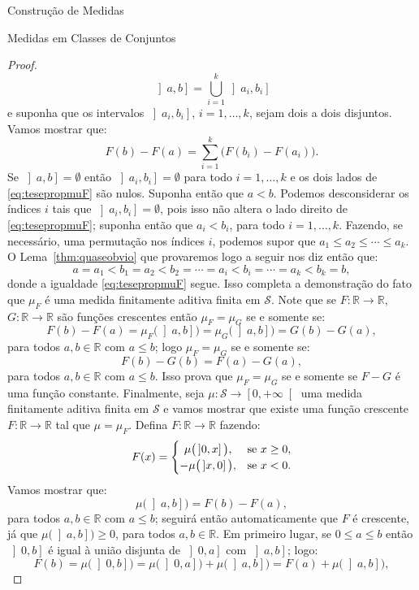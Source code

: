 \documentclass[oneside,final,11pt]{amsbook}
\newcommand{\R}{\mathds R}
\theoremstyle{remark}\newtheorem{exercise}{Exercício}[chapter]
\theoremstyle{remark}\newtheorem{*exercise}[exercise]{\hbox to 0pt{\hskip 0pt minus 1fil*}Exercício}
\theoremstyle{definition}\newtheorem{exdefin}{Definição}[chapter]
\theoremstyle{plain}\newtheorem{teo}{Teorema}[section]
\theoremstyle{plain}\newtheorem{lem}[teo]{Lema}
\theoremstyle{plain}\newtheorem{prop}[teo]{Proposição}
\theoremstyle{plain}\newtheorem{cor}[teo]{Corolário}
\theoremstyle{definition}\newtheorem{defin}[teo]{Definição}
\theoremstyle{remark}\newtheorem{rem}[teo]{Observação}
\theoremstyle{definition}\newtheorem{notation}[teo]{Notação}
\theoremstyle{definition}\newtheorem{convention}[teo]{Convenção}
\theoremstyle{definition}\newtheorem{example}[teo]{Exemplo}
\numberwithin{section}{chapter}
\numberwithin{equation}{section}
\begin{document}
\begin{chapter}{Construção de Medidas}
\begin{section}{Medidas em Classes de Conjuntos}
\begin{proof}
\[\left]a,b\right]=\bigcup_{i=1}^k\left]a_i,b_i\right]\]
e suponha que os intervalos $\left]a_i,b_i\right]$, $i=1,\ldots,k$, sejam dois a dois disjuntos. Vamos mostrar que:
\begin{equation}\label{eq:tesepropmuF}
F(b)-F(a)=\sum_{i=1}^k\big(F(b_i)-F(a_i)\big).
\end{equation}
Se $\left]a,b\right]=\emptyset$ então $\left]a_i,b_i\right]=\emptyset$ para todo $i=1,\ldots,k$ e os dois lados
de \eqref{eq:tesepropmuF} são nulos. Suponha então que $a<b$. Podemos desconsiderar os índices $i$ tais que
$\left]a_i,b_i\right]=\emptyset$, pois isso não altera o lado direito de \eqref{eq:tesepropmuF}; suponha então
que $a_i<b_i$, para todo $i=1,\ldots,k$. Fazendo, se necessário, uma permutação nos índices $i$, podemos supor
que $a_1\le a_2\le\cdots\le a_k$. O Lema~\ref{thm:quaseobvio} que provaremos logo a seguir nos diz então que:
\[a=a_1<b_1=a_2<b_2=\cdots=a_i<b_i=\cdots=a_k<b_k=b,\]
donde a igualdade \eqref{eq:tesepropmuF} segue. Isso completa a demonstração do fato que $\mu_F$ é uma medida
finitamente aditiva finita em $\mathcal S$. Note que se $F:\R\to\R$, $G:\R\to\R$ são funções crescentes então
$\mu_F=\mu_G$ se e somente se:
\[F(b)-F(a)=\mu_F\big(\left]a,b\right]\big)=\mu_G\big(\left]a,b\right]\big)=G(b)-G(a),\]
para todos $a,b\in\R$ com $a\le b$; logo $\mu_F=\mu_G$ se e somente se:
\[F(b)-G(b)=F(a)-G(a),\]
para todos $a,b\in\R$ com $a\le b$. Isso prova que $\mu_F=\mu_G$ se e somente se $F-G$ é uma função constante.
Finalmente, seja $\mu:\mathcal S\to\left[0,+\infty\right[$ uma medida finitamente aditiva finita em $\mathcal S$
e vamos mostrar que existe uma função crescente $F:\R\to\R$ tal que $\mu=\mu_F$. Defina $F:\R\to\R$ fazendo:
\[F(x)=\begin{cases}
\hfil\mu\big(\left]0,x\right]\big),&\text{se $x\ge0$},\\
-\mu\big(\left]x,0\right]\big),&\text{se $x<0$}.
\end{cases}\]
Vamos mostrar que:
\begin{equation}\label{eq:muehmuF}
\mu\big(\left]a,b\right]\big)=F(b)-F(a),
\end{equation}
para todos $a,b\in\R$ com $a\le b$; seguirá então automaticamente que $F$ é crescente, já que $\mu\big(\left]a,b\right]\big)\ge0$,
para todos $a,b\in\R$. Em primeiro lugar, se $0\le a\le b$ então $\left]0,b\right]$ é igual à união disjunta
de $\left]0,a\right]$ com $\left]a,b\right]$; logo:
\[F(b)=\mu\big(\left]0,b\right]\big)=\mu\big(\left]0,a\right]\big)+\mu\big(\left]a,b\right]\big)=
F(a)+\mu\big(\left]a,b\right]\big),\]

\end{proof}
\end{section}
\end{chapter}
\end{document}
